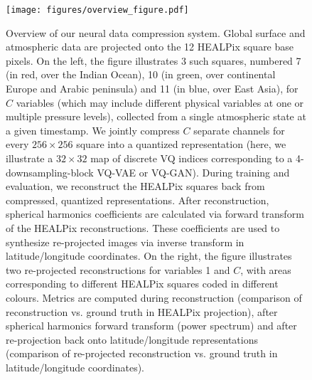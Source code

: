 
%

%
%
%

\begin{figure}
    \centering
    \texttt{[image: figures/overview\_figure.pdf]}
    \hfill
    \caption{Overview of our neural data compression system. Global surface and atmospheric data are projected onto the 12 HEALPix square base pixels. On the left, the figure illustrates 3 such squares, numbered 7 (in red, over the Indian Ocean), 10 (in green, over continental Europe and Arabic peninsula) and 11 (in blue, over East Asia), for $C$ variables (which may include different physical variables at one or multiple pressure levels), collected from a single atmospheric state at a given timestamp. We jointly compress $C$ separate channels for every $256 \times 256$ square into a quantized representation (here, we illustrate a $32 \times 32$ map of discrete VQ indices corresponding to a 4-downsampling-block VQ-VAE or VQ-GAN). During training and evaluation, we reconstruct the HEALPix squares back from compressed, quantized representations. After reconstruction, spherical harmonics coefficients are calculated via forward transform of the HEALPix reconstructions. These coefficients are used to synthesize re-projected images via inverse transform in latitude/longitude coordinates. On the right, the figure illustrates two re-projected reconstructions for variables 1 and $C$, with areas corresponding to different HEALPix squares coded in different colours. Metrics are computed during reconstruction (comparison of reconstruction vs. ground truth in HEALPix projection), after spherical harmonics forward transform (power spectrum) and after re-projection back onto latitude/longitude representations (comparison of re-projected reconstruction vs. ground truth in latitude/longitude coordinates).}
    \label{fig:system}
\end{figure}


